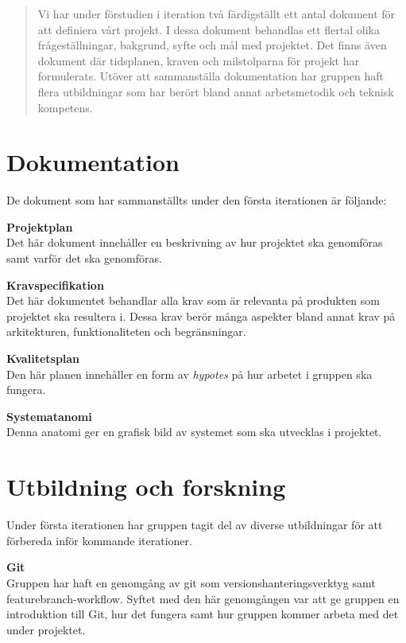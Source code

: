 \documentclass[a4paper,10pt, twoside]{article}
\begin{document}


\begin{abstract}
\noindent Vi har under förstudien i iteration två färdigställt ett antal dokument för att definiera vårt projekt. I dessa dokument behandlas ett flertal olika frågeställningar, bakgrund, syfte och mål med projektet. Det finns även dokument där tidsplanen, kraven och milstolparna för projekt har formulerats. Utöver att sammanställa dokumentation har gruppen haft flera utbildningar som har berört bland annat arbetsmetodik och teknisk kompetens.
\end{abstract}
\clearpage

\section{Dokumentation}
\label{sec:Dokumentation}
De dokument som har sammanställts under den första iterationen är följande:

\textbf{Projektplan}\\ Det här dokument innehåller en beskrivning av hur projektet ska genomföras samt varför det ska genomföras.

\textbf{Kravspecifikation}\\ Det här dokumentet behandlar alla krav som är relevanta på produkten som projektet ska resultera i. Dessa krav berör många aspekter bland annat krav på arkitekturen, funktionaliteten och begränsningar.

\textbf{Kvalitetsplan}\\ Den här planen innehåller en form av \emph{hypotes} på hur arbetet i gruppen ska fungera.

\textbf{Systematanomi}\\ Denna anatomi ger en grafisk bild av systemet som ska utvecklas i projektet.

\section{Utbildning och forskning}
\label{sec:Utbildning och forskning}
Under första iterationen har gruppen tagit del av diverse utbildningar för att förbereda inför kommande iterationer.

\textbf{Git}\\ Gruppen har haft en genomgång av git som versionshanteringsverktyg samt featurebranch-workflow. Syftet med den här genomgången var att ge gruppen en introduktion till Git, hur det fungera samt hur gruppen kommer arbeta med det under projektet.
\end{document}
